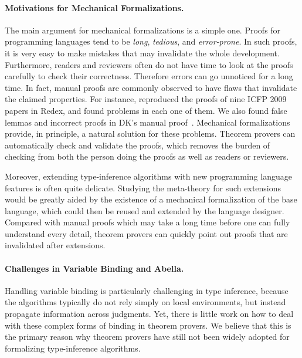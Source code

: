 \paragraph{Motivations for Mechanical Formalizations.}
The main argument for mechanical formalizations is a simple one.
Proofs for programming languages tend to be \emph{long}, \emph{tedious},
and \emph{error-prone}. In such proofs, it is very easy to make mistakes
that may invalidate the whole development.
Furthermore, readers and reviewers often do not have time to
look at the proofs carefully to check their correctness.
Therefore errors can go unnoticed for a long time.
In fact, manual proofs are commonly observed to have flaws
that invalidate the claimed properties.
For instance, \citet{KleinRunYourResearch} reproduced the proofs of
nine ICFP 2009 papers in Redex, and found problems in each one of them.
We also found false lemmas and incorrect proofs
in DK's manual proof~\citep{dunfield2013complete}.
Mechanical formalizations provide, in principle, a natural
solution for these problems. Theorem provers can automatically check and
validate the proofs, which removes the burden of checking from both
the person doing the proofs as well as readers or reviewers.

Moreover, extending type-inference algorithms with
new programming language features is often quite
delicate. Studying the meta-theory for such extensions would be
greatly aided by the existence of a mechanical
formalization of the base language,
which could then be reused and extended by the language designer.
Compared with manual proofs which may take a long time before
one can fully understand every detail,
theorem provers can quickly point out
proofs that are invalidated after extensions.


\paragraph{Challenges in Variable Binding and Abella.}
Handling variable binding is particularly challenging in type inference,
because the algorithms typically do not rely simply on local environments,
but instead propagate information across judgments.
Yet, there is little work on
how to deal with these complex forms of binding in theorem provers.
We believe that this is the primary reason
why theorem provers have still not been widely
adopted for formalizing type-inference algorithms.

